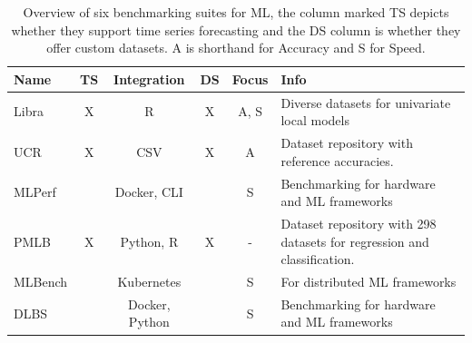 \begin{table}[h]
    \begin{tabularx}{\textwidth}{|l|c|c|c|c|X|}
        \hline
        Name    & TS & Integration    & DS & Focus & Info                                                                    \\
        \hline
        \hline
        Libra   & X  & R              & X  & A, S  & Diverse datasets for univariate local models                            \\
        \hline
        UCR     & X  & CSV            & X  & A     & Dataset repository with reference accuracies.                           \\
        \hline
        MLPerf  &    & Docker, CLI    &    & S     & Benchmarking for hardware and ML frameworks                             \\
        \hline
        PMLB    & X  & Python, R      & X  & -     & Dataset repository with 298 datasets for regression and classification. \\
        \hline
        MLBench &    & Kubernetes     &    & S     & For distributed ML frameworks                                           \\
        \hline
        DLBS    &    & Docker, Python &    & S     & Benchmarking for hardware and ML frameworks                             \\
        \hline
    \end{tabularx}
    \caption{Overview of six benchmarking suites for ML, the column marked TS depicts whether they support time series forecasting and the DS column is whether they offer custom datasets. A is shorthand for  Accuracy and S for Speed.}
    \label{tab:benchmarking_suites}
\end{table}

